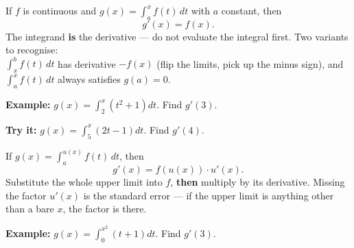 \documentclass[12pt]{article}
\begin{document}


\begin{formulabox}
If $f$ is continuous and $\displaystyle g(x) = \int_a^{x} f(t)\,dt$ with $a$ constant, then
\[ g'(x) = f(x). \]
The integrand \textbf{is} the derivative --- do not evaluate the integral first. Two variants
to recognise:\\[2pt]
$\displaystyle \int_{x}^{b} f(t)\,dt$ has derivative $-f(x)$ (flip the limits, pick up the
minus sign), and $\displaystyle \int_a^{x} f(t)\,dt$ always satisfies $g(a) = 0$.
\end{formulabox}

\begin{examplebox}
\textbf{Example:} \quad $g(x) = \int_2^{x}\left(t^2 + 1\right)dt$. Find $g'(3)$.
\end{examplebox}

\begin{tryitbox}
\textbf{Try it:} \quad $g(x) = \int_5^{x}\left(2t - 1\right)dt$. Find $g'(4)$.\\[2pt]
\end{tryitbox}


\begin{formulabox}
If $\displaystyle g(x) = \int_a^{u(x)} f(t)\,dt$, then
\[ g'(x) = f\!\left(u(x)\right) \cdot u'(x). \]
Substitute the whole upper limit into $f$, \textbf{then} multiply by its derivative. Missing
the factor $u'(x)$ is the standard error --- if the upper limit is anything other than a bare
$x$, the factor is there.
\end{formulabox}

\begin{examplebox}
\textbf{Example:} \quad $g(x) = \int_0^{x^2}\left(t + 1\right)dt$. Find $g'(3)$.
\end{examplebox}
\end{document}
